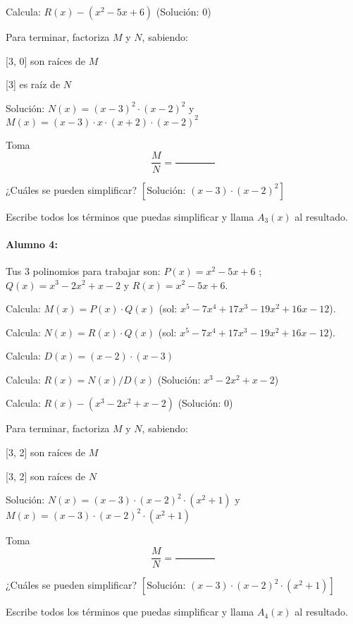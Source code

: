 Calcula: $R(x) - ( x^2 - 5x + 6 )$ (Solución: $ 0 $)

Para terminar, factoriza $M$ y $N$, sabiendo:

     [3, 0]  son raíces de $M$

     [3]  es raíz de $N$

Solución: $N(x) =  (x - 3)^2 \cdot  (x - 2)^2 $ y $M(x) =  (x - 3) \cdot  x \cdot  (x + 2) \cdot  (x - 2)^2 $

Toma \[\frac{M}{N} = \frac{\quad\quad\quad\quad}{\quad\quad\quad\quad}\]

¿Cuáles se pueden simplificar? $\left[\text{Solución: } (x - 3) \cdot  (x - 2)^2 \right]$

Escribe todos los términos que puedas simplificar y llama $A_3(x)$ al resultado.













\paragraph{Alumno 4:\\}



Tus 3 polinomios para trabajar son: $P(x) =  x^2 - 5x + 6 $ ; $Q(x) =  x^3 - 2x^2 + x - 2 $ y $R(x) =  x^2 - 5x + 6 $.



Calcula: $M(x) = P(x)\cdot  Q(x)$ (sol: $ x^5 - 7x^4 + 17x^3 - 19x^2 + 16x - 12 $).

Calcula: $N(x) = R(x)\cdot  Q(x)$ (sol: $ x^5 - 7x^4 + 17x^3 - 19x^2 + 16x - 12 $).

Calcula: $D(x) = ( x - 2 )\cdot  ( x - 3 )$

Calcula: $R(x) = N(x) / D(x)$ (Solución: $ x^3 - 2x^2 + x - 2 $)

Calcula: $R(x) - ( x^3 - 2x^2 + x - 2 )$ (Solución: $ 0 $)

Para terminar, factoriza $M$ y $N$, sabiendo:

     [3, 2]  son raíces de $M$

     [3, 2]  son raíces de $N$

Solución: $N(x) =  (x - 3) \cdot  (x - 2)^2 \cdot  (x^2 + 1) $ y $M(x) =  (x - 3) \cdot  (x - 2)^2 \cdot  (x^2 + 1) $

Toma \[\frac{M}{N} = \frac{\quad\quad\quad\quad}{\quad\quad\quad\quad}\]

¿Cuáles se pueden simplificar? $\left[\text{Solución: } (x - 3) \cdot  (x - 2)^2 \cdot  (x^2 + 1) \right]$

Escribe todos los términos que puedas simplificar y llama $A_4(x)$ al resultado.





